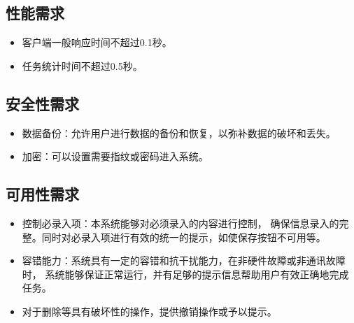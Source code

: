\subsection{性能需求}
\begin{itemize}
	\item 客户端一般响应时间不超过0.1秒。
	\item 任务统计时间不超过0.5秒。
\end{itemize}

\subsection{安全性需求}
\begin{itemize}
	\item 数据备份：允许用户进行数据的备份和恢复，以弥补数据的破坏和丢失。
	\item 加密：可以设置需要指纹或密码进入系统。
\end{itemize}

\subsection{可用性需求}
\begin{itemize}
	\item 控制必录入项：本系统能够对必须录入的内容进行控制，
	确保信息录入的完整。同时对必录入项进行有效的统一的提示，如使保存按钮不可用等。
	\item 容错能力：系统具有一定的容错和抗干扰能力，在非硬件故障或非通讯故障时，
	系统能够保证正常运行，并有足够的提示信息帮助用户有效正确地完成任务。
	\item 对于删除等具有破坏性的操作，提供撤销操作或予以提示。
\end{itemize}